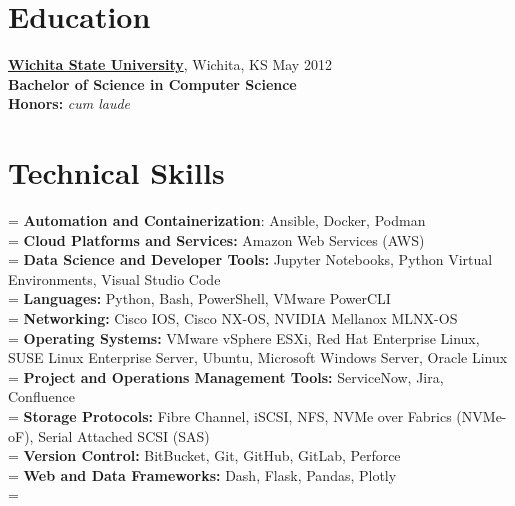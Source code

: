 \documentclass[10pt,letterpaper]{article}       %
\begin{document}
\vspace{-16.5pt}


\section*{Education}
\textbf{\href{https://www.wichita.edu}{Wichita State University}}, Wichita, KS \hfill May 2012 \\
\vspace{1pt}
\textbf{Bachelor of Science in Computer Science} \\
\vspace{1pt}
\textbf{Honors:} \textit{cum laude} \\



\vspace{-10pt}

\section*{Technical Skills}
\newlength{\mylength}
\setlength{\mylength}{9.25em}

\hangindent=\mylength
\textbf{Automation and Containerization}: Ansible, Docker, Podman \\
\hangindent=\mylength
\textbf{Cloud Platforms and Services:} Amazon Web Services (AWS) \\
\hangindent=\mylength
\textbf{Data Science and Developer Tools:} Jupyter Notebooks, Python Virtual Environments, Visual Studio Code \\
\hangindent=\mylength
\textbf{Languages:} Python, Bash, PowerShell, VMware PowerCLI \\
\hangindent=\mylength
\textbf{Networking:} Cisco IOS, Cisco NX-OS, NVIDIA Mellanox MLNX-OS \\
\hangindent=\mylength
\textbf{Operating Systems:} VMware vSphere ESXi, Red Hat Enterprise Linux, SUSE Linux Enterprise Server, Ubuntu, Microsoft Windows Server, Oracle Linux \\
\hangindent=\mylength
\textbf{Project and Operations Management Tools:} ServiceNow, Jira, Confluence \\
\hangindent=\mylength
\textbf{Storage Protocols:} Fibre Channel, iSCSI, NFS, NVMe over Fabrics (NVMe-oF), Serial Attached SCSI (SAS) \\
\hangindent=\mylength
\textbf{Version Control:} BitBucket, Git, GitHub, GitLab, Perforce \\
\hangindent=\mylength
\textbf{Web and Data Frameworks:} Dash, Flask, Pandas, Plotly \\
\hangindent=\mylength
\end{document}
